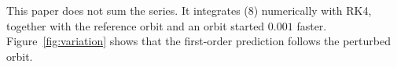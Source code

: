 This paper does not sum the series.
It integrates (8) numerically with RK4, together with the reference orbit and
an orbit started $0.001$ faster.
Figure~\ref{fig:variation} shows that the first-order prediction follows the
perturbed orbit.

